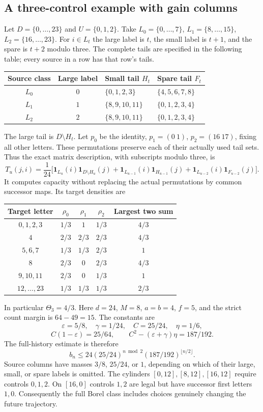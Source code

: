 \documentclass[11pt,reqno]{amsart}
\numberwithin{equation}{section}
\theoremstyle{definition}
\newcommand{\one}{\mathbf 1}
\newcommand{\eps}{\varepsilon}
\begin{document}
\subsection{A three-control example with gain columns}
Let $D=\{0,\ldots,23\}$ and $U=\{0,1,2\}$.
Take $L_0=\{0,\ldots,7\}$, $L_1=\{8,\ldots,15\}$,
$L_2=\{16,\ldots,23\}$. For $i\in L_t$ the large label is
$t$, the small label is $t+1$, and the spare is $t+2$ modulo three.
The complete tails are specified in the following table; every
source in a row has that row's tails.
\begin{center}
\begin{tabular}{ccll}
\toprule
Source class&Large label&Small tail $H_t$&Spare tail $F_t$\\
\midrule
$L_0$&$0$&$\{0,1,2,3\}$&$\{4,5,6,7,8\}$\\
$L_1$&$1$&$\{8,9,10,11\}$&$\{0,1,2,3,4\}$\\
$L_2$&$2$&$\{8,9,10,11\}$&$\{0,1,2,3,4\}$\\
\bottomrule
\end{tabular}
\end{center}
The large tail is $D\setminus H_t$. Let $p_0$ be the identity,
$p_1=(0\ 1)$, $p_2=(16\ 17)$, fixing all other letters.
These permutations preserve each of their actually used tail sets.
Thus the exact matrix description, with subscripts modulo three, is
\[
 T_u(j,i)=\frac1{24}\big[
 \one_{L_u}(i)\one_{D\setminus H_u}(j)+
 \one_{L_{u-1}}(i)\one_{H_{u-1}}(j)+
 \one_{L_{u-2}}(i)\one_{F_{u-2}}(j)\big].
\]
It computes capacity without replacing the actual permutations by
common successor maps. Its target densities are
\begin{center}
\begin{tabular}{c|ccc|c}
\toprule
Target letter&$\rho_0$&$\rho_1$&$\rho_2$&Largest two sum\\
\midrule
$0,1,2,3$&$1/3$&$1$&$1/3$&$4/3$\\
$4$&$2/3$&$2/3$&$2/3$&$4/3$\\
$5,6,7$&$1/3$&$1/3$&$2/3$&$1$\\
$8$&$2/3$&$0$&$2/3$&$4/3$\\
$9,10,11$&$2/3$&$0$&$1/3$&$1$\\
$12,\ldots,23$&$1/3$&$1/3$&$1/3$&$2/3$\\
\bottomrule
\end{tabular}
\end{center}
In particular $\Theta_3=4/3$. Here $d=24$, $M=8$, $a=b=4$,
$f=5$, and the strict count margin is $64-49=15$.
The constants are
\[
 \eps=5/8,\quad\gamma=1/24,\quad C=25/24,\quad\eta=1/6,
\]
\[
 C(1-\eps)=25/64,\qquad
 C^2-(\eps+\gamma)\eta=187/192.
\]
The full-history estimate is therefore
\begin{equation}\label{eq:gain-example}
 b_n\le24(25/24)^{n\bmod2}(187/192)^{\lfloor n/2\rfloor}.
\end{equation}
Source columns have masses $3/8$, $25/24$, or $1$, depending
on which of their large, small, or spare labels is omitted.
The cylinders $[0,12],[8,12],[16,12]$ require controls
$0,1,2$. On $[16,0]$ controls $1,2$ are legal but have successor
first letters $1,0$. Consequently the full Borel class includes
choices genuinely changing the future trajectory.
\end{document}
